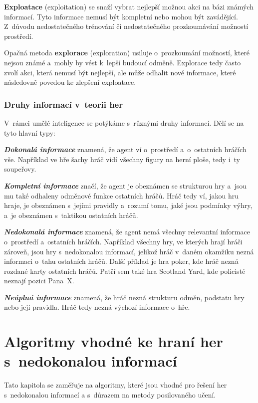 \textbf{Exploatace} (exploitation) se snaží vybrat nejlepší možnou akci na bázi známých informací.
Tyto informace nemusí být kompletní nebo mohou být zavádějící.
Z~důvodu nedostatečného trénování či nedostatečného prozkoumávání možností prostředí.

Opačná metoda \textbf{explorace} (exploration) usiluje o~prozkoumání možností, které nejsou známé a~mohly by vést k~lepší budoucí odměně.
Explorace tedy často zvolí akci, která nemusí být nejlepší, ale může odhalit nové informace, které následovně povedou ke zlepšení exploatace.

\subsection{Druhy informací v~teorii her}\label{subsec:druhy-informaci-v-teorii-her}
V~rámci umělé inteligence se potýkáme s~různými druhy informací.
Dělí se na tyto hlavní typy:

\textbf{\emph{Dokonalá informace}} znamená, že agent ví o~prostředí a~o~ostatních hráčích vše.
Například ve hře šachy hráč vidí všechny figury na herní ploše, tedy i~ty soupeřovy.

\textbf{\emph{Kompletní informace}} značí, že agent je obeznámen se strukturou hry a~jsou mu také odhaleny odměnové funkce ostatních hráčů.
Hráč tedy ví, jakou hru hraje, je obeznámen s~jejími pravidly a~rozumí tomu, jaké jsou podmínky výhry, a~je obeznámen s~taktikou ostatních hráčů.

\textbf{\emph{Nedokonalá informace}} znamená, že agent nemá všechny relevantní informace o~prostředí a~ostatních hráčích.
Například všechny hry, ve kterých hrají hráči zároveň, jsou hry s~nedokonalou informací, jelikož hráč v~daném okamžiku nezná informaci o~tahu ostatních hráčů.
Další příklad je hra poker, kde hráč nezná rozdané karty ostatních hráčů.
Patří sem také hra Scotland Yard, kde policisté neznají pozici Pana~X\@.

\textbf{\emph{Neúplná informace}} znamená, že hráč nezná strukturu odměn, podstatu hry nebo její pravidla.
Hráč tedy nezná výchozí informace o~hře.

\chapter{Algoritmy vhodné ke hraní her s~nedokonalou informací}
\label{sec:vhodne-algoritmy-k-reseni-her-s-nedokonalou-informaci}

Tato kapitola se zaměřuje na algoritmy, které jsou vhodné pro řešení her s~nedokonalou informací a s~důrazem na metody posilovaného učení.


